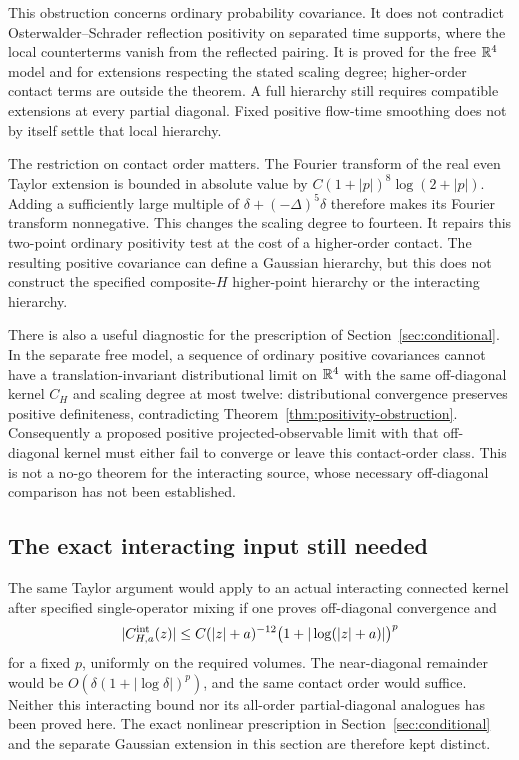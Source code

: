 \documentclass[11pt,letterpaper]{article}
\theoremstyle{plain}
\theoremstyle{remark}\newtheorem{remark}[theorem]{Scope}
\begin{document}
This obstruction concerns ordinary probability covariance. It does not contradict
Osterwalder--Schrader reflection positivity on separated time supports, where the
local counterterms vanish from the reflected pairing. It is proved for the free
$\mathbb R^4$ model and for extensions respecting the stated scaling degree; higher-order
contact terms are outside the theorem. A full hierarchy still requires compatible
extensions at every partial diagonal. Fixed positive flow-time smoothing does not
by itself settle that local hierarchy.

The restriction on contact order matters. The Fourier transform of the real even
Taylor extension is bounded in absolute value by
$C(1+|p|)^8\log(2+|p|)$. Adding a sufficiently large multiple of
$\delta+(-\Delta)^5\delta$ therefore makes its Fourier transform nonnegative.
This changes the scaling degree to fourteen. It repairs this two-point ordinary
positivity test at the cost of a higher-order contact. The resulting positive
covariance can define a Gaussian hierarchy, but this does not construct the
specified composite-$H$ higher-point hierarchy or the interacting hierarchy.

There is also a useful diagnostic for the prescription of
Section~\ref{sec:conditional}. In the separate free model, a sequence of
ordinary positive covariances cannot have a translation-invariant
distributional limit on $\mathbb R^4$ with the same off-diagonal kernel
$C_H$ and scaling degree at most twelve: distributional convergence preserves
positive definiteness, contradicting Theorem~\ref{thm:positivity-obstruction}.
Consequently a proposed positive projected-observable limit with that
off-diagonal kernel must either fail to converge or leave this contact-order
class. This is not a no-go theorem for the interacting source, whose necessary
off-diagonal comparison has not been established.

\subsection{The exact interacting input still needed}

The same Taylor argument would apply to an actual interacting connected kernel
after specified single-operator mixing if one proves off-diagonal convergence and
\begin{equation}
|C_{H,a}^{\rm int}(z)|\le
C(|z|+a)^{-12}\bigl(1+|\log(|z|+a)|\bigr)^p
\label{eq:interactingneeded}
\end{equation}
for a fixed $p$, uniformly on the required volumes. The near-diagonal remainder
would be $O(\delta(1+|\log\delta|)^p)$, and the same contact order would suffice.
Neither this interacting bound nor its all-order partial-diagonal analogues has
been proved here. The exact nonlinear prescription in Section~\ref{sec:conditional}
and the separate Gaussian extension in this section are therefore kept distinct.
\end{document}
